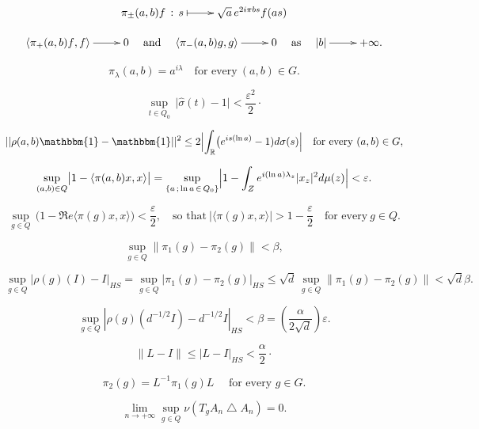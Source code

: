 \documentclass[11pt,english,a4paper]{article}
\begin{document}
\[
\xymatrix{
\pi _{\pm}(a,b)f\,:\,s\ar@{|->}[r]&\sqrt{a}\,e^{2i\pi bs}f(as)
}
\]

\[
\xymatrix{{\ensuremath{{\langle {\pi _{+}(a,b)f},{f}\rangle}}}\ar[r]&0}\quad \textrm{and}\quad \xymatrix{{\ensuremath{{\langle {\pi _{-}(a,b)g},{g}\rangle}}}\ar[r]&0}\quad\textrm{as}\quad
\xymatrix{|b|\ar[r]&+\infty .}
\]

\[
\pi _{\lambda }(a,b)=a^{i\lambda }\quad\textrm{for every}\ (a,b)\in G.
\]

\begin{equation}\label{Equation 21}
 \sup_{t\in{Q}_{0}}\,\bigl|\widehat{\sigma }(t)-1\bigr|<\dfrac{\varepsilon ^{2}}{2}\cdot 
\end{equation}

\[
||\rho (a,b)\mathbbm{1}-\mathbbm{1}||^{2}\le2\Bigl|\int_{\ensuremath{\mathbb R}}\bigl(e^{is(\ln a)}-1)d\sigma (s)\Bigr|\quad \textrm{for every}\ (a,b)\in G,
\]

\[
\sup_{(a,b)\in{Q}}\bigl|1-{\ensuremath{{\langle {\pi(a,b)x},{x}\rangle}}}\bigr|=\sup_{\{a\,;\,\ln  a\,\in\,{Q}_{0}\}}\Bigl|1-\int_{Z}e^{i(\ln a)\lambda _{z}}|x_{z}|^{2}d\mu (z)\Bigr|<\varepsilon.
\]

\[
\sup_{g\in{Q}}\,\bigl(1-\Re e {\ensuremath{{\langle {\pi (g)x},{x}\rangle}}}\bigr)<\dfrac{\varepsilon }{2}, \quad\textrm{so that}\
\bigl|{\ensuremath{{\langle {\pi (g)x},{x}\rangle}}}\bigr|>1-\dfrac{\varepsilon }{2}\quad \textrm{for every}\ g\in{Q}.
\]

$$ \sup_{g\in Q} \|\pi_1(g) - \pi_2(g)\| < \beta ,$$

\[
\sup_{g\in Q}\left|\rho(g)(I)-I\right|_{HS} = \sup_{g\in Q}\left|\pi_1(g)-\pi_2(g)\right|_{HS} \le  \sqrt{d}\,\sup_{g\in Q}\|\pi_1(g)-\pi_2(g)\| < \sqrt{d}\beta .
\]

$$ \sup_{g\in Q} |\rho(g)(d^{-1/2}I) - d^{-1/2}I|_{HS} < \beta 
= \left(\frac{\alpha}{2\sqrt{d}}\right)\varepsilon .$$

\begin{equation}\label{eq:LminusI}
\|L-I\| \le \left|L-I\right|_{HS} < \frac{\alpha}{2}\cdot
\end{equation}

\begin{equation}\label{eq:qqch}
 \pi_2(g) = L^{-1}\pi_1(g)L\quad  \textrm{ for every } g\in G .
\end{equation}

\begin{equation}\label{AS}
 \lim_{n\to+\infty }\sup_{g\in{Q}}\nu (T_g A_{n}\bigtriangleup  A_{n})=0.
\end{equation}
\end{document}
